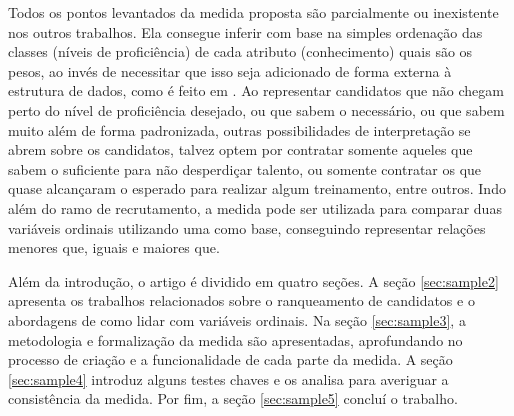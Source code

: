 \documentclass[preprint,12pt]{elsarticle}
\begin{document}
Todos os pontos levantados da medida proposta são parcialmente ou inexistente nos outros trabalhos. Ela consegue inferir com base na simples ordenação das classes (níveis de proficiência) de cada atributo (conhecimento) quais são os pesos, ao invés de necessitar que isso seja adicionado de forma externa à estrutura de dados, como é feito em \cite{impact-semantic-web-2005}. Ao representar candidatos que não chegam perto do nível de proficiência desejado, ou que sabem o necessário, ou que sabem muito além de forma padronizada, outras possibilidades de interpretação se abrem sobre os candidatos, talvez optem por contratar somente aqueles que sabem o suficiente para não desperdiçar talento, ou somente contratar os que quase alcançaram o esperado para realizar algum treinamento, entre outros. Indo além do ramo de recrutamento, a medida pode ser utilizada para comparar duas variáveis ordinais utilizando uma como base, conseguindo representar relações menores que, iguais e maiores que.

Além da introdução, o artigo é dividido em quatro seções. A seção \ref{sec:sample2} apresenta os trabalhos relacionados sobre o ranqueamento de candidatos e o abordagens de como lidar com variáveis ordinais. Na seção \ref{sec:sample3}, a metodologia e formalização da medida são apresentadas, aprofundando no processo de criação e a funcionalidade de cada parte da medida. A seção \ref{sec:sample4} introduz alguns testes chaves e os analisa para averiguar a consistência da medida. Por fim, a seção \ref{sec:sample5} concluí o trabalho.



  
\end{document}
